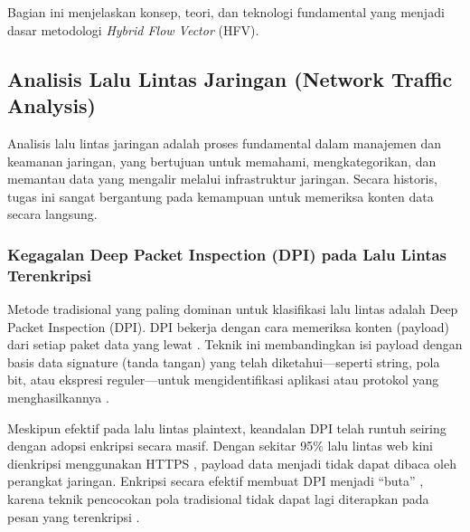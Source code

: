 \chapter{\babDua}
\label{cha:studiliteratur}
Bagian ini menjelaskan konsep, teori, dan teknologi fundamental yang menjadi dasar metodologi \textit{Hybrid Flow Vector} (HFV).


\section{Analisis Lalu Lintas Jaringan (Network Traffic Analysis)}
Analisis lalu lintas jaringan adalah proses fundamental dalam manajemen dan keamanan jaringan, yang bertujuan untuk memahami, mengkategorikan, dan memantau data yang mengalir melalui infrastruktur jaringan. Secara historis, tugas ini sangat bergantung pada kemampuan untuk memeriksa konten data secara langsung.

\subsection{Kegagalan Deep Packet Inspection (DPI) pada Lalu Lintas Terenkripsi}
Metode tradisional yang paling dominan untuk klasifikasi lalu lintas adalah Deep Packet Inspection (DPI). DPI bekerja dengan cara memeriksa konten (payload) dari setiap paket data yang lewat \citep{azab2024network}. Teknik ini membandingkan isi payload dengan basis data signature (tanda tangan) yang telah diketahui—seperti string, pola bit, atau ekspresi reguler—untuk mengidentifikasi aplikasi atau protokol yang menghasilkannya \citep{dainotti2012issues}.

Meskipun efektif pada lalu lintas plaintext, keandalan DPI telah runtuh seiring dengan adopsi enkripsi secara masif. Dengan sekitar 95\% lalu lintas web kini dienkripsi menggunakan HTTPS \citep{sharma2024survey}, payload data menjadi tidak dapat dibaca oleh perangkat jaringan. Enkripsi secara efektif membuat DPI menjadi ``buta'' \citep{anderson2018deciphering}, karena teknik pencocokan pola tradisional tidak dapat lagi diterapkan pada pesan yang terenkripsi \citep{anderson2018deciphering}.


